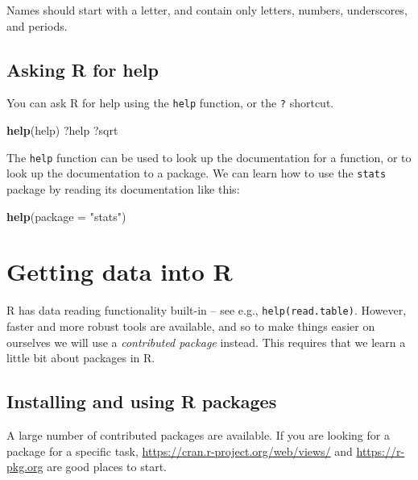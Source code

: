 \documentclass[]{book}
\newenvironment{Shaded}{\begin{snugshade}}{\end{snugshade}}
\newcommand{\KeywordTok}[1]{\textcolor[rgb]{0.13,0.29,0.53}{\textbf{#1}}}
\newcommand{\DataTypeTok}[1]{\textcolor[rgb]{0.13,0.29,0.53}{#1}}
\newcommand{\StringTok}[1]{\textcolor[rgb]{0.31,0.60,0.02}{#1}}
\newcommand{\NormalTok}[1]{#1}
\begin{document}
Names should start with a letter, and contain only letters, numbers,
underscores, and periods.

\subsection{Asking R for help}\label{asking-r-for-help}

You can ask R for help using the \texttt{help} function, or the
\texttt{?} shortcut.

\begin{Shaded}
\begin{Highlighting}[]
\KeywordTok{help}\NormalTok{(help)}
\NormalTok{?help}
\NormalTok{?sqrt}
\end{Highlighting}
\end{Shaded}

The \texttt{help} function can be used to look up the documentation for
a function, or to look up the documentation to a package. We can learn
how to use the \texttt{stats} package by reading its documentation like
this:

\begin{Shaded}
\begin{Highlighting}[]
\KeywordTok{help}\NormalTok{(}\DataTypeTok{package =} \StringTok{"stats"}\NormalTok{)}
\end{Highlighting}
\end{Shaded}

\section{Getting data into R}\label{getting-data-into-r}

R has data reading functionality built-in -- see e.g.,
\texttt{help(read.table)}. However, faster and more robust tools are
available, and so to make things easier on ourselves we will use a
\emph{contributed package} instead. This requires that we learn a little
bit about packages in R.

\subsection{Installing and using R
packages}\label{installing-and-using-r-packages}

A large number of contributed packages are available. If you are looking
for a package for a specific task,
\url{https://cran.r-project.org/web/views/} and \url{https://r-pkg.org}
are good places to start.
\end{document}

